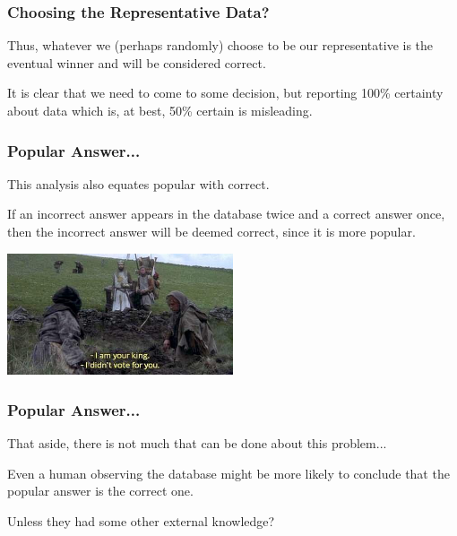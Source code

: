 \begin{frame}
\frametitle{Choosing the Representative Data?}

Thus, whatever we (perhaps randomly) choose to be our representative is the eventual winner and will be considered correct. 

It is clear that we need to come to some decision, but reporting 100\% certainty about data which is, at best, 50\% certain is misleading. 

\end{frame}

\begin{frame}
\frametitle{Popular Answer...}

This analysis also equates popular with correct.

If an incorrect answer appears in the database twice and a correct answer once, then the incorrect answer will be deemed correct, since it is more popular. 

\begin{center}
	\includegraphics[width=0.5\textwidth]{images/vote.jpg}
\end{center}



\end{frame}

\begin{frame}
\frametitle{Popular Answer...}

That aside, there is not much that can be done about this problem... 

Even a human observing the database might be more likely to conclude that the popular answer is the correct one. 

Unless they had some other external knowledge?

\end{frame}


